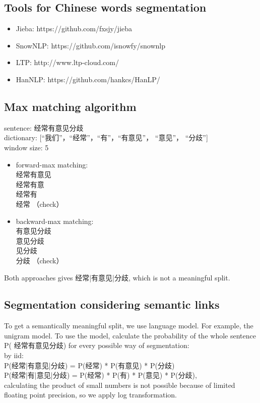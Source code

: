 \documentclass{report}
\begin{document}
\subsection{Tools for Chinese words segmentation}
\begin{itemize}
	\item Jieba: https://github.com/fxsjy/jieba
	\item SnowNLP: https://github.com/isnowfy/snownlp
	\item LTP: http://www.ltp-cloud.com/
	\item HanNLP: https://github.com/hankcs/HanLP/
\end{itemize}

\subsection{Max matching algorithm}
\noindent sentence: 经常有意见分歧\\
dictionary: [“我们”，“经常”，“有”，“有意见”， “意见”， “分歧”]\\
window size: 5

\begin{itemize}
	\item forward-max matching:\\
		经常有意见\\
		经常有意\\
		经常有\\
		经常 （check）
	\item backward-max matching:\\
		有意见分歧\\
		意见分歧\\
		见分歧\\
		分歧 （check）
\end{itemize}
Both approaches gives 经常|有意见|分歧, which is not a meaningful split.

\subsection{Segmentation considering semantic links}
To get a semantically meaningful split, we use language model. For example, the unigram model. To use the model, calculate the probability of the whole sentence P( 经常有意见分歧) for every possible way of segmentation: \\ 
by iid:\\
P(经常|有意见|分歧) = P(经常) * P(有意见) * P(分歧) \\
P(经常|有|意见|分歧) = P(经常) * P(有) * P(意见) * P(分歧),\\
calculating the product of small numbers is not possible because of limited floating point precision, so we apply log transformation.
\end{document}
